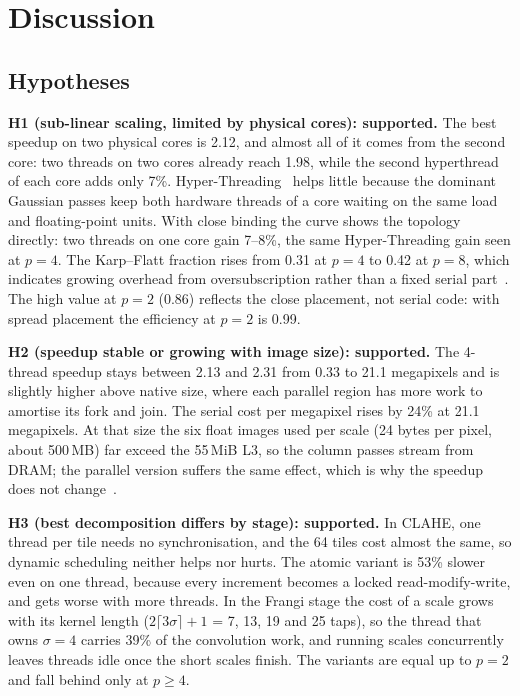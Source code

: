 \section{Discussion}\label{sec:discussion}

\subsection{Hypotheses}
\textbf{H1 (sub-linear scaling, limited by physical cores): supported.} The best speedup on two physical cores
is 2.12, and almost all of it comes from the second core: two threads on two cores already reach 1.98, while
the second hyperthread of each core adds only 7\%. Hyper-Threading~\cite{marr2002} helps little because the
dominant Gaussian passes keep both hardware threads of a core waiting on the same load and floating-point
units. With close binding the curve shows the topology directly: two threads on one core gain 7--8\%, the same
Hyper-Threading gain seen at $p=4$. The Karp--Flatt fraction rises from 0.31 at $p=4$ to 0.42 at $p=8$, which
indicates growing overhead from oversubscription rather than a fixed serial part~\cite{karp1990}. The high
value at $p=2$ (0.86) reflects the close placement, not serial code: with spread placement the efficiency at
$p=2$ is 0.99.

\textbf{H2 (speedup stable or growing with image size): supported.} The 4-thread speedup stays between 2.13 and
2.31 from 0.33 to 21.1 megapixels and is slightly higher above native size, where each parallel region has more
work to amortise its fork and join. The serial cost per megapixel rises by 24\% at 21.1 megapixels. At that size
the six float images used per scale (24 bytes per pixel, about 500\,MB) far exceed the 55\,MiB L3, so the
column passes stream from DRAM; the parallel version suffers the same effect, which is why the speedup does not
change~\cite{williams2009}.

\textbf{H3 (best decomposition differs by stage): supported.} In CLAHE, one thread per tile needs no
synchronisation, and the 64 tiles cost almost the same, so dynamic scheduling neither helps nor hurts. The
atomic variant is 53\% slower even on one thread, because every increment becomes a locked read-modify-write,
and gets worse with more threads. In the Frangi stage the cost of a scale grows with its kernel length
($2\lceil3\sigma\rceil+1$ = 7, 13, 19 and 25 taps), so the thread that owns $\sigma=4$ carries 39\% of the
convolution work, and running scales concurrently leaves threads idle once the short scales finish. The
variants are equal up to $p=2$ and fall behind only at $p\ge4$.

